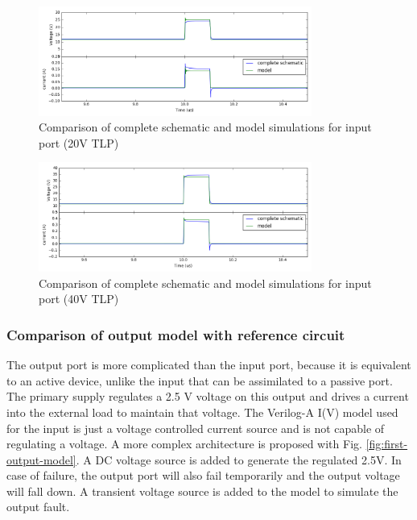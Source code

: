 \begin{figure}[!p]
  \centering
  \includegraphics[width=0.8\textwidth]{src/4/figures/comparison_model_total_20V.png}
  \caption{Comparison of complete schematic and model simulations for input port (20V TLP)}
  \label{fig:compare-model-simu-20}
\end{figure}

\begin{figure}[!p]
  \centering
  \includegraphics[width=0.8\textwidth]{src/4/figures/comparison_model_total_40V.png}
  \caption{Comparison of complete schematic and model simulations for input port (40V TLP)}
  \label{fig:compare-model-simu-40}
\end{figure}

\subsubsection{Comparison of output model with reference circuit}

The output port is more complicated than the input port, because it is equivalent to an active device, unlike the input that can be assimilated to a passive port.
The primary supply regulates a 2.5 V voltage on this output and drives a current into the external load to maintain that voltage.
The Verilog-A I(V) model used for the input is just a voltage controlled current source and is not capable of regulating a voltage.
A more complex architecture is proposed with Fig. \ref{fig:first-output-model}.
A DC voltage source is added to generate the regulated 2.5V.
In case of failure, the output port will also fail temporarily and the output voltage will fall down.
A transient voltage source is added to the model to simulate the output fault.

